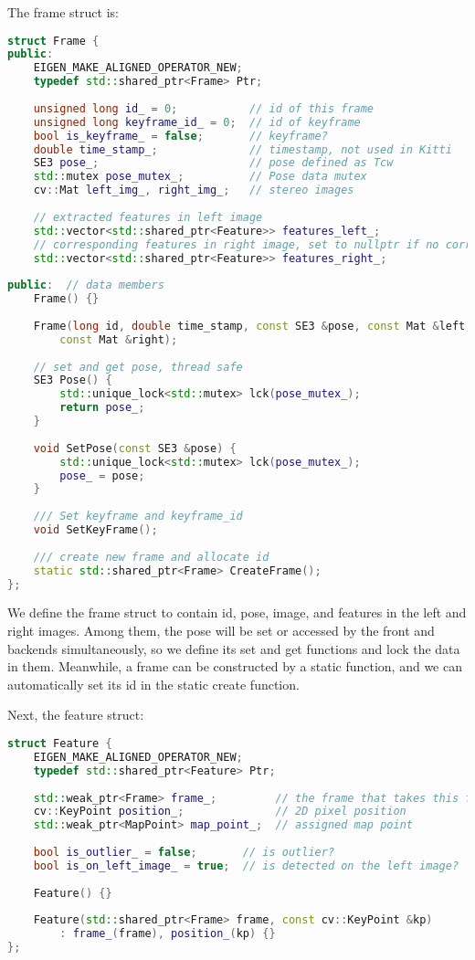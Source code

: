 The frame struct is:
\begin{lstlisting}[language=c++,caption=slambook2/ch13/include/myslam/frame.h]
struct Frame {
public:
	EIGEN_MAKE_ALIGNED_OPERATOR_NEW;
	typedef std::shared_ptr<Frame> Ptr;
	
	unsigned long id_ = 0;           // id of this frame
	unsigned long keyframe_id_ = 0;  // id of keyframe
	bool is_keyframe_ = false;       // keyframe?
	double time_stamp_;              // timestamp, not used in Kitti
	SE3 pose_;                       // pose defined as Tcw
	std::mutex pose_mutex_;          // Pose data mutex
	cv::Mat left_img_, right_img_;   // stereo images
	
	// extracted features in left image
	std::vector<std::shared_ptr<Feature>> features_left_;
	// corresponding features in right image, set to nullptr if no corresponding
	std::vector<std::shared_ptr<Feature>> features_right_;
	
public:  // data members
	Frame() {}
	
	Frame(long id, double time_stamp, const SE3 &pose, const Mat &left,
		const Mat &right);
	
	// set and get pose, thread safe
	SE3 Pose() {
		std::unique_lock<std::mutex> lck(pose_mutex_);
		return pose_;
	}
	
	void SetPose(const SE3 &pose) {
		std::unique_lock<std::mutex> lck(pose_mutex_);
		pose_ = pose;
	}
	
	/// Set keyframe and keyframe_id 
	void SetKeyFrame();
	
	/// create new frame and allocate id
	static std::shared_ptr<Frame> CreateFrame();
};
\end{lstlisting}

We define the frame struct to contain id, pose, image, and features in the left and right images. Among them, the pose will be set or accessed by the front and backends simultaneously, so we define its set and get functions and lock the data in them. Meanwhile, a frame can be constructed by a static function, and we can automatically set its id in the static create function.

Next, the feature struct:
\begin{lstlisting}[language=c++,caption=slambook2/ch13/include/myslam/feature.h]
struct Feature {
	EIGEN_MAKE_ALIGNED_OPERATOR_NEW;
	typedef std::shared_ptr<Feature> Ptr;
	
	std::weak_ptr<Frame> frame_;         // the frame that takes this feature
	cv::KeyPoint position_;              // 2D pixel position
	std::weak_ptr<MapPoint> map_point_;  // assigned map point
	
	bool is_outlier_ = false;       // is outlier?
	bool is_on_left_image_ = true;  // is detected on the left image?
	
	Feature() {}
	
	Feature(std::shared_ptr<Frame> frame, const cv::KeyPoint &kp)
		: frame_(frame), position_(kp) {}
};
\end{lstlisting}

